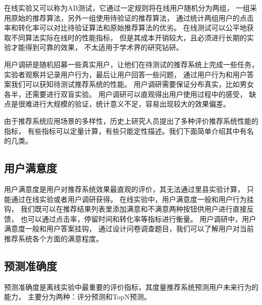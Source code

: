 在线实验又可以称为AB测试，它通过一定规则将在线用户随机分为两组，
一组采用原始的推荐算法，另外一组使用待验证的推荐算法，
通过统计两组用户的点击率和转化率可以对比待验证算法和原始推荐算法的优劣。
在线测试可以公平地获取不同算法实际在线时的性能指标，
但是其成本开销较大，且必须进行长期的实验才能得到可靠的效果，
不太适用于学术界的研究钻研。

用户调研是随机招募一些真实用户，让他们在待测试的推荐系统上完成一些任务，
实验者观察并记录用户行为，最后让用户回答一些问题，
通过用户行为和用户答案我们可以获知待测试推荐系统的性能。
用户调研需要保证分布真实，比如男女各半，还需要进行双盲实验。
用户调研可以直观得出用户使用过程中的感受，
缺点是很难进行大规模的验证，统计意义不足，容易出现较大的效果偏差。

由于推荐系统应用场景的多样性，历史上研究人员提出了多种评价推荐系统性能的指标，
有些指标可以定量计算，有些只能定性描述。我们下面简单介绍其中有名的几类。

\subsection{用户满意度}
用户满意度是用户对推荐系统效果最直观的评价，其无法通过里县实验计算，
只能通过在线实验或者用户调研获得。
在线实验中，用户满意度一般和用户行为挂钩，
我们既可以在推荐结果列表里添加满意和不满意两种按钮供用户进行直接反馈，
也可以通过点击率，停留时间和转化率等指标进行衡量。
用户调研中，用户满意度一般和用户答案挂钩，
通过设计问卷调查题目，我们可以了解用户对当前推荐系统各个方面的满意程度。

\subsection{预测准确度}
预测准确度是离线实验中最重要的评价指标，其度量推荐系统预测用户未来行为的能力，
主要分为两种：评分预测和TopN预测。

